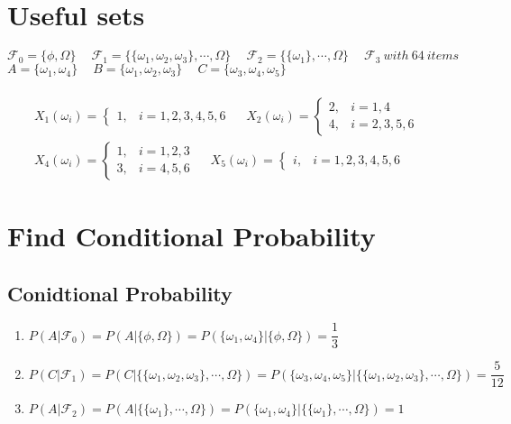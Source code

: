 \documentclass[12pt]{article}
\begin{document}
 

\rhead{\today}
\section*{Useful sets}
$\mathcal{F}_0 = \{\phi,\Omega\} \quad\ \mathcal{F}_1 = \{\{\omega_1, \omega_2, \omega_3\},\cdots, \Omega\}\quad\ \mathcal{F}_2 = \{\{\omega_1\},\cdots, \Omega\}\quad\ \mathcal{F}_3\ with\ 64\ items$\\
$A = \{\omega_1, \omega_4\}\quad\ B = \{\omega_1, \omega_2, \omega_3\}\quad\ C = \{\omega_3, \omega_4, \omega_5\}$\\\\
\begin{align*}
    X_1(\omega_i)=\begin{cases}
        1, & i = 1,2,3,4,5,6
    \end{cases}\quad\ 
    X_2(\omega_i)=\begin{cases}
        2, & i = 1,4\\
        4, & i = 2,3,5,6
    \end{cases}\quad\ \\
    X_4(\omega_i)=\begin{cases}
        1, & i = 1,2,3\\
        3, & i = 4,5,6
    \end{cases}\quad\ 
    X_5(\omega_i)=\begin{cases}
        i, & i = 1,2,3,4,5,6
    \end{cases}
\end{align*}
\section{Find Conditional Probability}
\subsection*{Conidtional Probability}
\begin{enumerate}
    \item $P(A|\mathcal{F}_0)=P(A|\{\phi,\Omega\}) = P(\{\omega_1, \omega_4\}|\{\phi,\Omega\}) = \dfrac{1}{3}$ 
    \item $P(C|\mathcal{F}_1) = P(C|\{\{\omega_1, \omega_2, \omega_3\},\cdots, \Omega\}) = P(\{\omega_3, \omega_4, \omega_5\}|\{\{\omega_1, \omega_2, \omega_3\},\cdots, \Omega\}) = \dfrac{5}{12}$
    \item $P(A|\mathcal{F}_2) = P(A|\{\{\omega_1\},\cdots, \Omega\}) = P(\{\omega_1, \omega_4\}|\{\{\omega_1\},\cdots, \Omega\}) = 1$ 
\end{enumerate}
\end{document}
